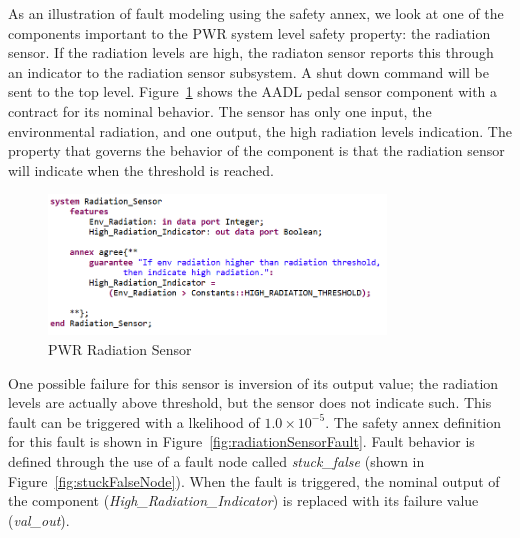 As an illustration of fault modeling using the safety annex, we look at one of the components important to the PWR system level safety property: the radiation sensor.  If the radiation levels are high, the radiaton sensor reports this through an indicator to the radiation sensor subsystem. A shut down command will be sent to the top level. Figure~\ref{fig:radiationSensor} shows the AADL pedal sensor component with a contract for its nominal behavior. The sensor has only one input, the environmental radiation, and one output, the high radiation levels indication. The property that governs the behavior of the component is that the radiation sensor will indicate when the threshold is reached.

\begin{figure}[h!]
	\begin{center}
		\includegraphics[width=0.8\textwidth]{images/radiationSensor.png}
		\caption{PWR Radiation Sensor}
		\label{fig:radiationSensor}
	\end{center}
\end{figure}

One possible failure for this sensor is inversion of its output value; the radiation levels are actually above threshold, but the sensor does not indicate such. This fault can be triggered with a lkelihood of $1.0\times 10^{-5}$. The safety annex definition for this fault is shown in Figure~\ref{fig:radiationSensorFault}. Fault behavior is defined through the use of a fault node called \textit{stuck\_false} (shown in Figure~\ref{fig:stuckFalseNode}).  When the fault is triggered, the nominal output of the component (\textit{High\_Radiation\_Indicator}) is replaced with its failure value (\textit{val\_out}). 

